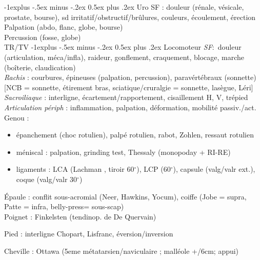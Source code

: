 \documentclass[a5paper,12pt]{article}
\makeatletter
\renewcommand{\subsection}{\@startsection{subsection}{2}{0mm}%
                                {-1explus -.5ex minus -.2ex}%
                                {0.5ex plus .2ex}%
                                {\normalfont\normalsize\bfseries}}
\makeatother
\begin{document}
\subsection{Uro}
SF : douleur (rénale, vésicale, prostate, bourse), sd
irritatif/obstructif/brûlures, couleurs, écoulement, érection\\
Palpation (abdo, flanc, globe, bourse)\\
Percussion (fosse, globe)\\
TR/TV
\newpage
\subsection{Locomoteur}
\emph{SF}: douleur (articulation, méca/infla), raideur, gonflement, craquement,
blocage, marche (boîterie, claudication)\\
\emph{Rachis} : courbures, épineuses (palpation, percussion), paravértébraux
(sonnette) [NCB = sonnette, étirement bras, sciatique/cruralgie = sonnette,
lasègue, Léri]\\
\emph{Sacroiliaque} : interligne, écartement/rapportement, cisaillement H, V, trépied\\
\emph{Articulation périph} : inflammation, palpation, déformation, mobilité passiv./act.\\
Genou :
\begin{itemize}
\item épanchement (choc rotulien), palpé rotulien, rabot, Zohlen, ressaut rotulien
\item méniscal : palpation, grinding test, Thessaly (monopoday + RI-RE)
\item ligaments : LCA (Lachman , tiroir 60$^{\circ}$), LCP (60$^{\circ}$),
    capsule (valg/valr ext.), coque (valg/valr 30$^{\circ}$)
\end{itemize}
Épaule : conflit sous-acromial (Neer, Hawkins, Yocum), coiffe (Jobe = supra,
Patte = infra, belly-press= sous-scap)\\
Poignet : Finkelsten (tendinop. de De Quervain)

Pied : interligne Chopart, Lisfranc, éversion/inversion

Cheville : Ottawa (5eme métatarsien/naviculaire ; malléole +/6cm; appui)
\end{document}

